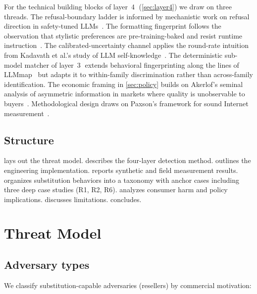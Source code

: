 \documentclass[10pt,a4paper,twocolumn]{article}
\begin{document}
For the technical building blocks of layer~\textcircled{4} (\cref{sec:layer4})
we draw on three threads. The refusal-boundary ladder is informed by
mechanistic work on refusal direction in safety-tuned
LLMs~\cite{arditi2024refusal}. The formatting fingerprint follows the
observation that stylistic preferences are pre-training-baked and resist
runtime instruction~\cite{mcgovern2024stylistic}. The calibrated-uncertainty
channel applies the round-rate intuition from Kadavath et al.'s study of LLM
self-knowledge~\cite{kadavath2022know}. The deterministic sub-model matcher of
layer~\textcircled{3} extends behavioral fingerprinting along the lines of
LLMmap~\cite{pasquini2024llmmap} but adapts it to within-family discrimination
rather than across-family identification. The economic framing in
\cref{sec:policy} builds on Akerlof's seminal analysis of asymmetric
information in markets where quality is unobservable to
buyers~\cite{akerlof1970lemons}. Methodological design draws on Paxson's
framework for sound Internet measurement~\cite{paxson2004sound}.

\subsection{Structure}
 lays out the threat model.  describes the
four-layer detection method.  outlines the engineering
implementation.  reports synthetic and field measurement
results.  organizes substitution behaviors into a taxonomy
with anchor cases including three deep case studies (R1, R2, R6).
 analyzes consumer harm and policy implications.
 discusses limitations.  concludes.

\section{Threat Model}\label{sec:threat}

\subsection{Adversary types}
We classify substitution-capable adversaries (resellers) by commercial motivation:
\end{document}
